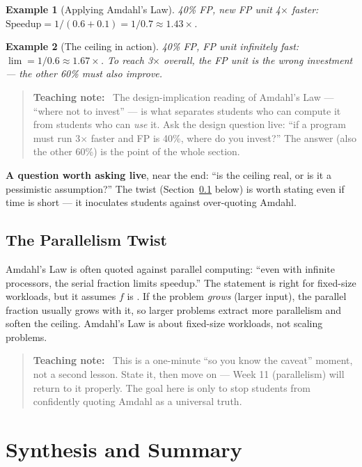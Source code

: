 \documentclass[11pt]{article}
\newtheorem{example}{Example}[section]
\newenvironment{teachingaside}{\begin{quote}\small\color{primary-gold}\textbf{Teaching note:}\ }{\end{quote}}
\begin{document}
\begin{example}[Applying Amdahl's Law]
40\% FP, new FP unit 4$\times$ faster: $\text{Speedup} = 1/(0.6 + 0.1) = 1/0.7 \approx 1.43\times$.
\end{example}

\begin{example}[The ceiling in action]
40\% FP, FP unit infinitely fast: $\lim = 1/0.6 \approx 1.67\times$. To reach 3$\times$ overall, the FP unit is the wrong investment --- the other 60\% must also improve.
\end{example}

\begin{teachingaside}
The design-implication reading of Amdahl's Law --- ``where not to invest'' --- is what separates students who can compute it from students who can \emph{use} it. Ask the design question live: ``if a program must run 3$\times$ faster and FP is 40\%, where do you invest?'' The answer (also the other 60\%) is the point of the whole section.
\end{teachingaside}

\textbf{A question worth asking live}, near the end: ``is the ceiling real, or is it a pessimistic assumption?'' The twist (Section~\ref{sec:twist} below) is worth stating even if time is short --- it inoculates students against over-quoting Amdahl.

\subsection{The Parallelism Twist}
\label{sec:twist}

Amdahl's Law is often quoted against parallel computing: ``even with infinite processors, the serial fraction limits speedup.'' The statement is right for fixed-size workloads, but it assumes $f$ is . If the problem \emph{grows} (larger input), the parallel fraction usually grows with it, so larger problems extract more parallelism and soften the ceiling. Amdahl's Law is about fixed-size workloads, not scaling problems.

\begin{teachingaside}
This is a one-minute ``so you know the caveat'' moment, not a second lesson. State it, then move on --- Week 11 (parallelism) will return to it properly. The goal here is only to stop students from confidently quoting Amdahl as a universal truth.
\end{teachingaside}

\section{Synthesis and Summary}
\end{document}
